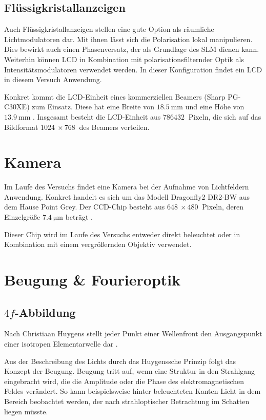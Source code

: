 \documentclass[
class=book,
accentcolor=1b,
custommargins=geometry,
fontsize=11pt,
thesis={type=Versuchsanleitung},
ruledheaders=all,
headline=false,
instbox=false,
marginpar=false,
title=small,
ignore-missing-data=true,
twoside=false,
pdfa=false %
]{apqpub}
\begin{document}
	\subsection{Flüssigkristallanzeigen}
Auch Flüssigkristallanzeigen stellen eine gute Option als räumliche Lichtmodulatoren dar.
Mit ihnen lässt sich die Polarisation lokal manipulieren.
Dies bewirkt auch einen Phasenversatz, der als Grundlage des SLM dienen kann.
Weiterhin können LCD in Kombination mit polarisationsfilternder Optik als Intensitätsmodulatoren verwendet werden.
In dieser Konfiguration findet ein LCD in diesem Versuch Anwendung.

Konkret kommt die LCD-Einheit eines kommerziellen Beamers (Sharp PG-C30XE) zum Einsatz.
Diese hat eine Breite von $\SI{18.5}{\milli \metre}$ und eine Höhe von $\SI{13.9}{\milli \metre}$ \cite{manual:Sharp}. 
Insgesamt besteht die LCD-Einheit aus $\SI{786 432}{}$ Pixeln, die sich auf das Bildformat $\SI{1024}{} \times \SI{768}{}$ des Beamers verteilen. 

\section{Kamera}
Im Laufe des Versuchs findet eine Kamera bei der Aufnahme von Lichtfeldern Anwendung.
Konkret handelt es sich um das Modell Dragonfly2 DR2-BW aus dem Hause Point Grey.
Der CCD-Chip besteht aus $\SI{648}{} \times \SI{480}{}$ Pixeln, deren Einzelgröße $\SI{7.4}{\micro\metre}$ beträgt \cite{manual:cam}.   

Dieser Chip wird im Laufe des Versuchs entweder direkt beleuchtet oder in Kombination mit einem vergrößernden Objektiv verwendet.

	\section{Beugung \& Fourieroptik}
	\subsection*{$4f$-Abbildung}
Nach Christiaan Huygens stellt jeder Punkt einer Wellenfront den Ausgangspunkt einer isotropen Elementarwelle dar \cite[S. 876 ff.]{Hecht}.

Aus der Beschreibung des Lichts durch das Huygenssche Prinzip folgt das Konzept der Beugung.
Beugung tritt auf, wenn eine Struktur in den Strahlgang eingebracht wird, die die Amplitude oder die Phase des elektromagnetischen Feldes verändert.
So kann beispielsweise hinter beleuchteten Kanten Licht in dem Bereich beobachtet werden, der nach strahloptischer Betrachtung im Schatten liegen müsste.
\end{document}
